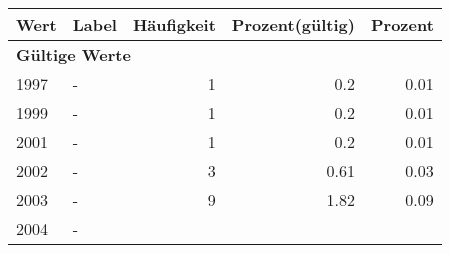      \begin{longtable}{lXrrr}
     \toprule
     \textbf{Wert} & \textbf{Label} & \textbf{Häufigkeit} & \textbf{Prozent(gültig)} & \textbf{Prozent} \\
     \endhead
     \midrule
     \multicolumn{5}{l}{\textbf{Gültige Werte}}\\

     1997 &
     \multicolumn{1}{X}{ -  } &


       \num{1} &
       \num[round-mode=places,round-precision=2]{0,2} &
         \num[round-mode=places,round-precision=2]{0,01} \\

     1999 &
     \multicolumn{1}{X}{ -  } &


       \num{1} &
       \num[round-mode=places,round-precision=2]{0,2} &
         \num[round-mode=places,round-precision=2]{0,01} \\

     2001 &
     \multicolumn{1}{X}{ -  } &


       \num{1} &
       \num[round-mode=places,round-precision=2]{0,2} &
         \num[round-mode=places,round-precision=2]{0,01} \\

     2002 &
     \multicolumn{1}{X}{ -  } &


       \num{3} &
       \num[round-mode=places,round-precision=2]{0,61} &
         \num[round-mode=places,round-precision=2]{0,03} \\

     2003 &
     \multicolumn{1}{X}{ -  } &


       \num{9} &
       \num[round-mode=places,round-precision=2]{1,82} &
         \num[round-mode=places,round-precision=2]{0,09} \\

     2004 &
     \multicolumn{1}{X}{ -  } &



\end{longtable}
